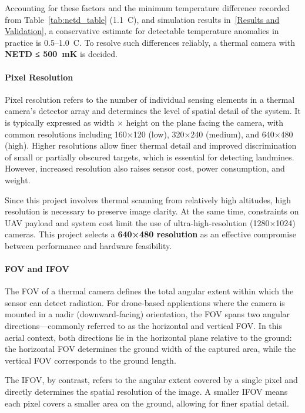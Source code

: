 Accounting for these factors and the minimum temperature difference recorded from Table~\ref{tab:netd_table} (1.1~\textdegree C), and simulation results in~\ref{Results and Validation}, a conservative estimate for detectable temperature anomalies in practice is 0.5–1.0~\textdegree C. To resolve such differences reliably, a thermal camera with \textbf{\gls{NETD} ≤ 500~mK} is decided.


\paragraph{Pixel Resolution}

Pixel resolution refers to the number of individual sensing elements in a thermal camera’s detector array and determines the level of spatial detail of the system. It is typically expressed as width × height on the plane facing the camera, with common resolutions including 160×120 (low), 320×240 (medium), and 640×480 (high). Higher resolutions allow finer thermal detail and improved discrimination of small or partially obscured targets, which is essential for detecting landmines. However, increased resolution also raises sensor cost, power consumption, and weight.

Since this project involves thermal scanning from relatively high altitudes, high resolution is necessary to preserve image clarity. At the same time, constraints on \gls{UAV} payload and system cost limit the use of ultra-high-resolution (1280×1024) cameras. This project selects a \textbf{640×480 resolution} as an effective compromise between performance and hardware feasibility.


\paragraph{FOV and IFOV}

The \gls{FOV} of a thermal camera defines the total angular extent within which the sensor can detect radiation. For drone-based applications where the camera is mounted in a nadir (downward-facing) orientation, the \gls{FOV} spans two angular directions—commonly referred to as the horizontal and vertical \gls{FOV}. In this aerial context, both directions lie in the horizontal plane relative to the ground: the horizontal \gls{FOV} determines the ground width of the captured area, while the vertical FOV corresponds to the ground length.

The \gls{IFOV}, by contrast, refers to the angular extent covered by a single pixel and directly determines the spatial resolution of the image. A smaller \gls{IFOV} means each pixel covers a smaller area on the ground, allowing for finer spatial detail.

